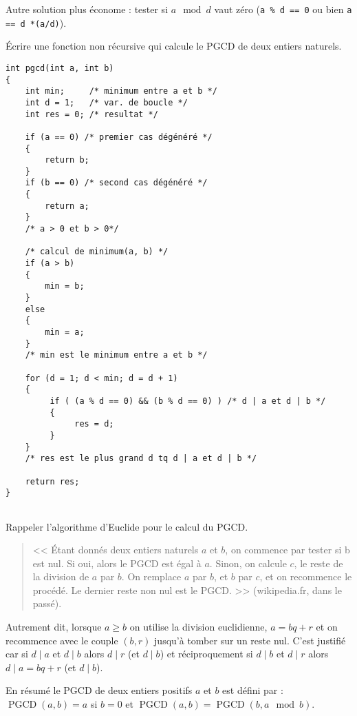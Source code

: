 \begin{newenu}
\begin{correction}
Autre solution plus économe : tester si $a \mod d$ vaut zéro (\verb+a % d == 0+ ou bien \verb+a == d *(a/d)+).

 \end{correction}
\item Écrire une fonction non récursive qui calcule le PGCD de deux entiers naturels.

  \begin{correction}
    \begin{verbatim}
int pgcd(int a, int b)
{
    int min;     /* minimum entre a et b */
    int d = 1;   /* var. de boucle */
    int res = 0; /* resultat */

    if (a == 0) /* premier cas dégénéré */
    {
        return b;
    }
    if (b == 0) /* second cas dégénéré */
    {
        return a;
    }
    /* a > 0 et b > 0*/

    /* calcul de minimum(a, b) */
    if (a > b)
    {
        min = b;
    }
    else
    {
        min = a;
    }
    /* min est le minimum entre a et b */

    for (d = 1; d < min; d = d + 1)
    {
         if ( (a % d == 0) && (b % d == 0) ) /* d | a et d | b */
         {
              res = d;
         }
    }
    /* res est le plus grand d tq d | a et d | b */

    return res;
}


\end{verbatim}
\end{correction}

\item Rappeler l'algorithme d'Euclide pour le calcul du PGCD.
  \begin{correction}
    \begin{quote}
  << Étant donnés deux entiers naturels $a$ et $b$, on
commence par tester si b est nul. Si oui, alors le PGCD est égal à
$a$. Sinon, on calcule $c$, le reste de la division de $a$ par $b$. On
remplace $a$ par $b$, et $b$ par $c$, et on recommence le procédé. Le
dernier reste non nul est le PGCD. >> (wikipedia.fr, dans le passé).
\end{quote}

Autrement dit, lorsque $a \geq b$ on utilise la division euclidienne, $a = bq + r$ et on recommence avec le couple $(b, r)$ jusqu'à tomber sur un reste nul. C'est justifié car si $d \mid a$ et $d \mid b$  alors $d \mid r$ (et $d \mid b$) et réciproquement si $d \mid b$ et $d \mid r$ alors $d \mid a = bq  + r$ (et $d\mid b$).

En résumé le PGCD de deux entiers positifs $a$ et $b$
est défini par : $\operatorname{PGCD}(a, b) = a$ si $ b = 0$ et
$\operatorname{PGCD}(a, b) = \operatorname{PGCD}(b, a \mod b)$.


\end{correction}
\end{newenu}
